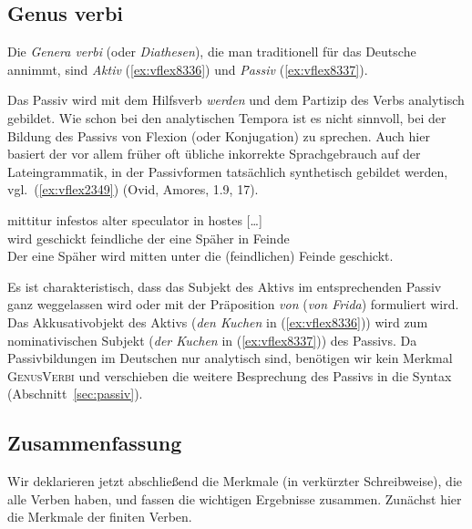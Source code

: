 \subsection{Genus verbi}

\label{sec:genusverb}


Die \textit{Genera verbi} (oder \textit{Diathesen}), die man traditionell für das Deutsche annimmt, sind \textit{Aktiv} (\ref{ex:vflex8336}) und \textit{Passiv} (\ref{ex:vflex8337}).

\begin{exe}
\end{exe}

Das Passiv wird mit dem Hilfsverb \textit{werden} und dem Partizip des Verbs analytisch gebildet.
Wie schon bei den analytischen Tempora ist es nicht sinnvoll, bei der Bildung des Passivs von Flexion (oder Konjugation) zu sprechen.
Auch hier basiert der vor allem früher oft übliche inkorrekte Sprachgebrauch auf der Lateingrammatik, in der Passivformen tatsächlich synthetisch gebildet werden, vgl.\ (\ref{ex:vflex2349}) (Ovid, Amores, 1.9, 17).

\begin{exe}
  \ex\label{ex:vflex2349}\gll mittitur infestos alter speculator in hostes [\ldots]\\
  {wird geschickt} {feindliche} {der eine} Späher {in} {Feinde}\\
  \glt Der eine Späher wird mitten unter die (feindlichen) Feinde geschickt.
\end{exe}

Es ist charakteristisch, dass das Subjekt des Aktivs im entsprechenden Passiv ganz weggelassen wird oder mit der Präposition \textit{von} (\zB \textit{von Frida}) formuliert wird.
Das Akkusativobjekt des Aktivs (\textit{den Kuchen} in (\ref{ex:vflex8336})) wird zum nominativischen Subjekt (\textit{der Kuchen} in (\ref{ex:vflex8337})) des Passivs.
Da Passivbildungen im Deutschen nur analytisch sind, benötigen wir kein Merkmal \textsc{GenusVerbi} und verschieben die weitere Besprechung des Passivs in die Syntax (Abschnitt~\ref{sec:passiv}).

\subsection{Zusammenfassung}

Wir deklarieren jetzt abschließend die Merkmale (in verkürzter Schreibweise), die alle Verben haben, und fassen die wichtigen Ergebnisse zusammen.
Zunächst hier die Merkmale der finiten Verben.

